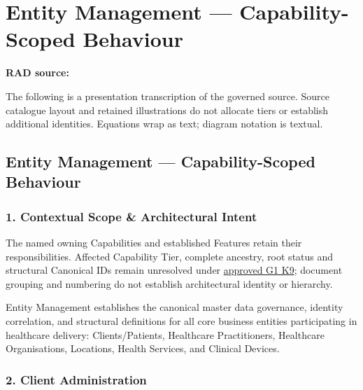 \chapter{Entity Management — Capability-Scoped Behaviour}\label{rad:em}
\noindent\textbf{RAD source:} \texttt{}

The following is a presentation transcription of the governed source. Source catalogue layout and retained illustrations do not allocate tiers or establish additional identities. Equations wrap as text; diagram notation is textual.

\label{rad:em:1}
\section*{Entity Management — Capability-Scoped Behaviour}
\label{rad:em:3}
\subsection*{1. Contextual Scope \& Architectural Intent}
\label{rad:em:5}

The named owning Capabilities and established Features retain their responsibilities. Affected Capability Tier, complete ancestry, root status and structural Canonical IDs remain unresolved under \hyperref[rad:k9:1392]{approved G1 K9}; document grouping and numbering do not establish architectural identity or hierarchy.

\label{rad:em:7}

Entity Management establishes the canonical master data governance, identity correlation, and structural definitions for all core business entities participating in healthcare delivery: Clients/\allowbreak{}Patients, Healthcare Practitioners, Healthcare Organisations, Locations, Health Services, and Clinical Devices.

\label{rad:em:9}

\par\smallskip
{}\label{rad:em:11}
\subsection*{2. Client Administration}
\label{rad:em:13}

